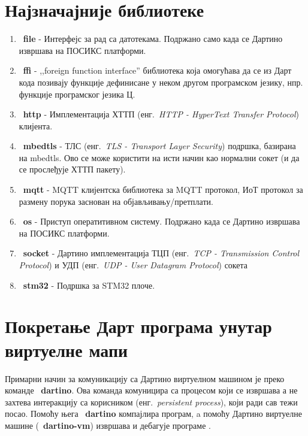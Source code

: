 \documentclass[12pt,oneside]{memoir}
\begin{document}
\section{Најзначајније библиотеке}
\begin{enumerate}

\item ~\textbf{file} - Интерфејс за рад са датотекама. Подржано само када се Дартино извршава на ПОСИКС платформи.

\item ~\textbf{ffi} - ,,foreign function interface'' библиотека која омогућава да се из Дарт кода позивају функције дефинисане у неком другом програмском језику, нпр. функције програмског језика Ц.

\item ~\textbf{http} - Имплементација ХТТП (енг.~\textit{HTTP - HyperText Transfer Protocol}) клијента.

\item ~\textbf{mbedtls} - ТЛС (енг.~\textit{TLS - Transport Layer Security}) подршка, базирана на mbedtls. Ово се може користити на исти начин као нормални сокет (и да се прослеђује ХТТП пакету).

\item ~\textbf{mqtt} - MQTT клијентска библиотека за MQTT протокол, ИоТ протокол за размену порука заснован на објављивању/претплати.

\item ~\textbf{os} - Приступ оператитивном систему. Подржано када се Дартино извршава на ПОСИКС платформи.

\item ~\textbf{socket} - Дартино имплементација ТЦП (енг.~\textit{TCP - Transmission Control Protocol}) и УДП (енг.~\textit{UDP - User Datagram Protocol}) сокета

\item ~\textbf{stm32} - Подршка за STM32 плоче.

\end{enumerate}

\section{Покретање Дарт програма унутар виртуелне мапи}
\label{sec:pokretanje}

Примарни начин за комуникацију са Дартино виртуелном машином је преко команде ~\textbf{dartino}. Ова команда комуницира са процесом који се извршава а не захтева интеракцију са корисником (енг.~\textit{persistent process}), који ради сав тежи посао. Помоћу њега ~\textbf{dartino} компајлира програм, a помоћу Дартино виртуелне машине (~\textbf{dartino-vm}) извршава и дебагује програме .\\
\end{document}
